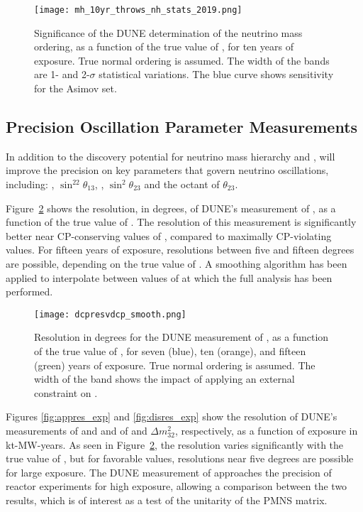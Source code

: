 \begin{figure}[h!]
    \centering
		\texttt{[image: mh\_10yr\_throws\_nh\_stats\_2019.png]}
	\caption[Significance of the DUNE determination of the neutrino mass ordering: statistical variations]{Significance of the DUNE determination of the neutrino mass ordering, as a function of the true value of \deltacp, for ten years of exposure. True normal ordering is assumed. The width of the bands are 1- and 2-$\sigma$ statistical variations. The blue curve shows sensitivity for the Asimov set.}
    \label{fig:mh_stats}
\end{figure}

\subsection{Precision Oscillation Parameter Measurements}
\label{sec:physics-lbnosc-prec}

In addition to the discovery potential for neutrino mass hierarchy and , 
 will improve the precision on key parameters that govern neutrino oscillations, including: \deltacp, $\sin^22\theta_{13}$, , $\sin^2\theta_{23}$ and the octant of $\theta_{23}$. 

Figure~\ref{fig:dcpresvdcp} shows the resolution, in degrees, of DUNE's measurement of \deltacp, as a function of the true value of \deltacp. The resolution of this measurement is significantly better near CP-conserving values of \deltacp, compared to maximally CP-violating values. For fifteen years of exposure, resolutions between five and fifteen degrees are possible, depending on the true value of \deltacp. A smoothing algorithm has been applied to interpolate between values of \deltacp at which the full analysis has been performed.

\begin{figure}[h!]
    \centering
		\texttt{[image: dcpresvdcp\_smooth.png]}
	\caption[Resolution for the DUNE measurement of \deltacp as a function of \deltacp]
	{Resolution in degrees for the DUNE measurement of \deltacp, as a function of the true value of \deltacp, for seven (blue), ten (orange), and fifteen (green) years of exposure. True normal ordering is assumed. The width of the band shows the impact of applying an external constraint on .}
    \label{fig:dcpresvdcp}
\end{figure}

Figures \ref{fig:appres_exp} and  \ref{fig:disres_exp} show the resolution of DUNE's measurements of \deltacp and  and of  and $\Delta m^{2}_{32}$, respectively, as a function of exposure in kt-MW-years. As seen in Figure~\ref{fig:dcpresvdcp}, the \deltacp resolution varies significantly with the true value of \deltacp, but for favorable values, resolutions near five degrees are possible for large exposure. The DUNE measurement of  approaches the precision of reactor experiments for high exposure, allowing a comparison between the two results, which is of interest as a test of the unitarity of the PMNS matrix. 

